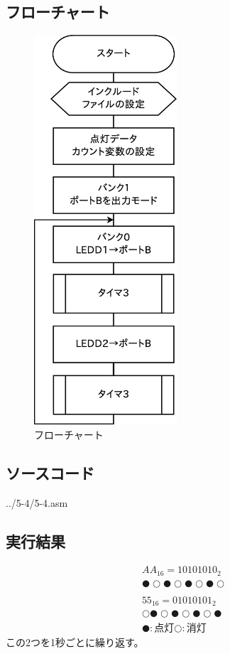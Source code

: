 \documentclass[a4paper,12pt]{ujarticle}
\begin{document}
   \subsection{フローチャート}
   \begin{figure}[htbp]
    \begin{center}
     \includegraphics[height=145mm]{Diagram5-4.eps}
    \end{center}
    \caption{フローチャート}
    \label{fig}
   \end{figure}
   \clearpage
   \subsection{ソースコード}
   \begin{lstinputlisting}[basicstyle=\ttfamily\footnotesize, frame=single]
    {../5-4/5-4.asm}
   \end{lstinputlisting}
   \subsection{実行結果}
   \begin{eqnarray*}
    {AA}_{16} = 10101010_2 \\
    ●○●○●○●○ \\
    \\
    {55}_{16} = 01010101_2 \\
    ○●○●○●○● \\
    ●:点灯○:消灯
   \end{eqnarray*}
   この2つを1秒ごとに繰り返す。
\end{document}
